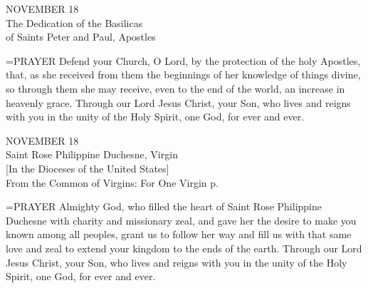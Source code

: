 \begin{center}\normalsize NOVEMBER 18\\
\footnotesize The Dedication of the Basilicas\\
\footnotesize of Saints Peter and Paul, Apostles\\
\end{center}

\hangindent=\parindent \small{PRAYER 
Defend your Church, O Lord,
by the protection of the holy Apostles,
that, as she received from them
the beginnings of her knowledge of things divine,
so through them she may receive,
even to the end of the world,
an increase in heavenly grace.
Through our Lord Jesus Christ, your Son,
who lives and reigns with you in the unity of the Holy Spirit,
one God, for ever and ever.\\}
 
\begin{center}\normalsize NOVEMBER 18\\
\footnotesize Saint Rose Philippine Duchesne, Virgin\\
\footnotesize [In the Dioceses of the United States]\\
\footnotesize From the Common of Virgins: For One Virgin p.\\
\end{center}

\hangindent=\parindent \small{PRAYER 
Almighty God, who filled the heart of Saint Rose Philippine Duchesne
with charity and missionary zeal,
and gave her the desire
to make you known among all peoples,
grant us to follow her way
and fill us with that same love and zeal
to extend your kingdom to the ends of the earth.
Through our Lord Jesus Christ, your Son,
who lives and reigns with you in the unity of the Holy Spirit,
one God, for ever and ever.\\}
 
